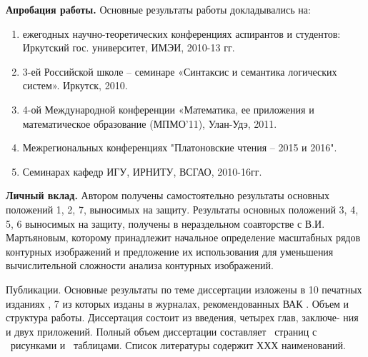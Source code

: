 \noindent
\textbf{Апробация работы.} Основные результаты работы докладывались на: 
\begin{enumerate}
\item ежегодных научно-теоретических конференциях аспирантов и студентов:  Иркутский  гос. университет, ИМЭИ, 2010-13 гг.
\item 3-ей Российской школе – семинаре «Синтаксис и семантика логических систем». Иркутск, 2010.
\item 4-ой Международной конференции «Математика, ее приложения и математическое   
    образование (МПМО’11),  Улан-Удэ, 2011.
\item Межрегиональных конференциях "Платоновские чтения – 2015 и 2016".
\item Семинарах кафедр ИГУ, ИРНИТУ, ВСГАО, 2010-16гг.
\end{enumerate}

\textbf{Личный вклад.} Автором получены самостоятельно результаты основных положений 1, 2, 7,  выносимых  на защиту.  Результаты основных положений 3, 4, 5, 6  выносимых  на защиту, получены в нераздельном соавторстве с В.И. Мартьяновым, которому принадлежит начальное определение масштабных рядов контурных изображений и предложение их использования для уменьшения вычислительной сложности анализа контурных изображений.

Публикации. Основные результаты по теме диссертации изложены в 10 печатных
изданиях \cite{D5,D6,D7,D8, D15,D16,D18,D19,D20}, 7 из которых изданы в журналах, рекомендованных ВАК \cite{D6,D7,D8, D15,D19,D20}.
Объем и структура работы. Диссертация состоит из введения, четырех глав, заключе-
ния и двух приложений. Полный объем диссертации составляет \pageref{LastPage}\ страниц с \totalfigures\ рисунками и \totaltables\ таблицами. Список литературы содержит ХХХ наименований.

%


